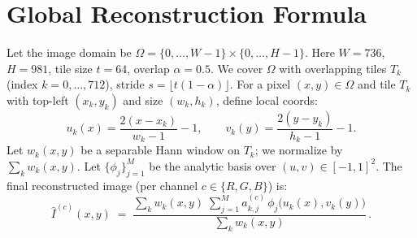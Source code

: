 \section*{Global Reconstruction Formula}
Let the image domain be $\Omega=\{0,\dots,W-1\}\times\{0,\dots,H-1\}$.
Here $W=736$, $H=981$, tile size $t=64$, overlap $\alpha=0.5$.
We cover $\Omega$ with overlapping tiles $T_k$ (index $k=0,\dots,712$), stride $s=\lfloor t(1-\alpha)\rfloor$.
For a pixel $(x,y)\in\Omega$ and tile $T_k$ with top-left $(x_k,y_k)$ and size $(w_k,h_k)$, define local coords:
\[ u_k(x)=\frac{2(x-x_k)}{w_k-1}-1,\qquad v_k(y)=\frac{2(y-y_k)}{h_k-1}-1. \]
Let $w_k(x,y)$ be a separable Hann window on $T_k$; we normalize by $\sum_k w_k(x,y)$.
Let $\{\phi_j\}_{j=1}^M$ be the analytic basis over $(u,v)\in[-1,1]^2$.
The final reconstructed image (per channel $c\in\{R,G,B\}$) is:
\[ \hat I^{(c)}(x,y) \;=\; \frac{\displaystyle \sum_{k} w_k(x,y)\;\sum_{j=1}^M a^{(c)}_{k,j}\,\phi_j\!\big(u_k(x),v_k(y)\big)}{\displaystyle \sum_{k} w_k(x,y)}\,. \]
